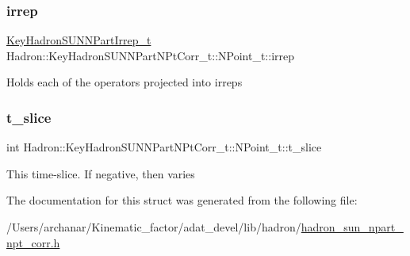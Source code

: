 \subsubsection{\texorpdfstring{irrep}{irrep}}
{\footnotesize\ttfamily \mbox{\hyperlink{structHadron_1_1KeyHadronSUNNPartIrrep__t}{Key\+Hadron\+S\+U\+N\+N\+Part\+Irrep\+\_\+t}} Hadron\+::\+Key\+Hadron\+S\+U\+N\+N\+Part\+N\+Pt\+Corr\+\_\+t\+::\+N\+Point\+\_\+t\+::irrep}

Holds each of the operators projected into irreps \mbox{\label{structHadron_1_1KeyHadronSUNNPartNPtCorr__t_1_1NPoint__t_a4c2126c62685080f6e33544a9ba60488}} 
\subsubsection{\texorpdfstring{t\_slice}{t\_slice}}
{\footnotesize\ttfamily int Hadron\+::\+Key\+Hadron\+S\+U\+N\+N\+Part\+N\+Pt\+Corr\+\_\+t\+::\+N\+Point\+\_\+t\+::t\+\_\+slice}

This time-\/slice. If negative, then varies 

The documentation for this struct was generated from the following file\+:\begin{DoxyCompactItemize}
\item 
/\+Users/archanar/\+Kinematic\+\_\+factor/adat\+\_\+devel/lib/hadron/\mbox{\hyperlink{lib_2hadron_2hadron__sun__npart__npt__corr_8h}{hadron\+\_\+sun\+\_\+npart\+\_\+npt\+\_\+corr.\+h}}\end{DoxyCompactItemize}
